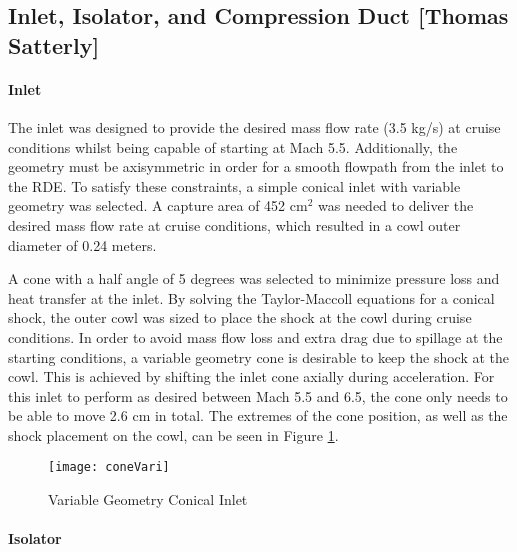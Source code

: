 \subsection{Inlet, Isolator, and Compression Duct [Thomas Satterly]}
\paragraph{Inlet}

The inlet was designed to provide the desired mass flow rate (3.5 kg/s) at cruise conditions whilst being capable of starting at Mach 5.5. Additionally, the geometry must be axisymmetric in order for a smooth flowpath from the inlet to the RDE. To satisfy these constraints, a simple conical inlet with variable geometry was selected. A capture area of 452 $\text{cm}^2$ was needed to deliver the desired mass flow rate at cruise conditions, which resulted in a cowl outer diameter of 0.24 meters.
 
A cone with a half angle of 5 degrees was selected to minimize pressure loss and heat transfer at the inlet. By solving the Taylor-Maccoll equations for a conical shock, the outer cowl was sized to place the shock at the cowl during cruise conditions. In order to avoid mass flow loss and extra drag due to spillage at the starting conditions, a variable geometry cone is desirable to keep the shock at the cowl. This is achieved by shifting the inlet cone axially during acceleration. For this inlet to perform as desired between Mach 5.5 and 6.5, the cone only needs to be able to move 2.6 cm in total. The extremes of the cone position, as well as the shock placement on the cowl, can be seen in Figure \ref{fig:coneVari}.

\begin{figure}[H]
\begin{center}
\texttt{[image: coneVari]}
\caption{Variable Geometry Conical Inlet}
\label{fig:coneVari}
\end{center}
\end{figure}

\paragraph{Isolator}

